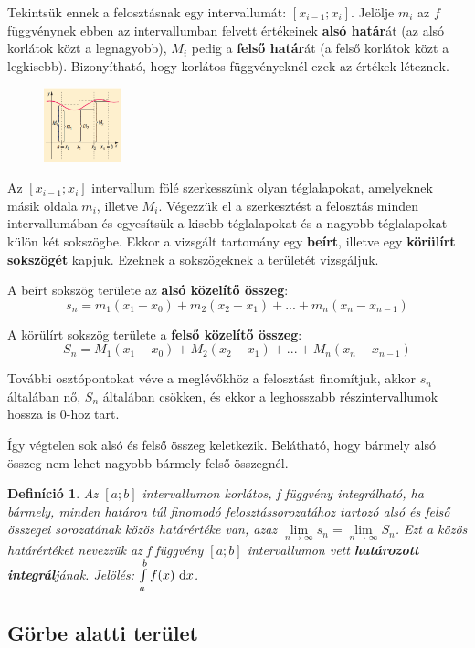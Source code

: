 \documentclass[12pt,a4paper]{article}
\newtheorem{definition}{Definíció} [section]
\begin{document}
Tekintsük ennek a felosztásnak egy intervallumát: $[x_{i - 1}; x_i]$. Jelölje $m_i$ az $f$ függvénynek ebben az intervallumban felvett értékeinek \textbf{alsó határ}át (az alsó korlátok közt a legnagyobb), $M_i$ pedig a \textbf{felső határ}át (a felső korlátok közt a legkisebb). Bizonyítható, hogy korlátos függvényeknél ezek az értékek léteznek.
\begin{figure}[h]
\centering
\includegraphics[width=0.2\textwidth]{gorbe_alatti_terulet_felosztasa}
\end{figure}
\newpage
Az $[x_{i - 1}; x_i]$ intervallum fölé szerkesszünk olyan téglalapokat, amelyeknek másik oldala $m_i$, illetve $M_i$. Végezzük el a szerkesztést a felosztás minden intervallumában és egyesítsük a kisebb téglalapokat és a nagyobb téglalapokat külön két sokszögbe. Ekkor a vizsgált tartomány egy \textbf{beírt}, illetve egy \textbf{körülírt sokszögét} kapjuk. Ezeknek a sokszögeknek a területét vizsgáljuk.

A beírt sokszög területe az \textbf{alsó közelítő összeg}:
$$s_n=m_1(x_1-x_0)+m_2(x_2-x_1)+...+m_n(x_n-x_{n-1})$$

A körülírt sokszög területe a \textbf{felső közelítő összeg}:
$$S_n=M_1(x_1-x_0)+M_2(x_2-x_1)+...+M_n(x_n-x_{n-1})$$

További osztópontokat véve a meglévőkhöz a felosztást finomítjuk, akkor $s_n$ általában nő, $S_n$ általában csökken, és ekkor a leghosszabb részintervallumok hossza is 0-hoz tart.

Így végtelen sok alsó és felső összeg keletkezik. Belátható, hogy bármely alsó összeg nem lehet nagyobb bármely felső összegnél.
\begin{definition}
Az $[a; b]$ intervallumon korlátos, f függvény integrálható, ha bármely, minden határon túl finomodó felosztássorozatához tartozó alsó és felső összegei sorozatának közös határértéke van, azaz $\lim\limits_{n\to \infty} s_n=\lim\limits_{n\to \infty} S_n$. Ezt a közös határértéket nevezzük az f függvény $[a; b]$ intervallumon vett \textbf{határozott integrál}jának. Jelölés: $\int\limits_a^bf(x) {\normalfont\text{ d}}x$.
\end{definition}

\subsection{Görbe alatti terület}
\end{document}
